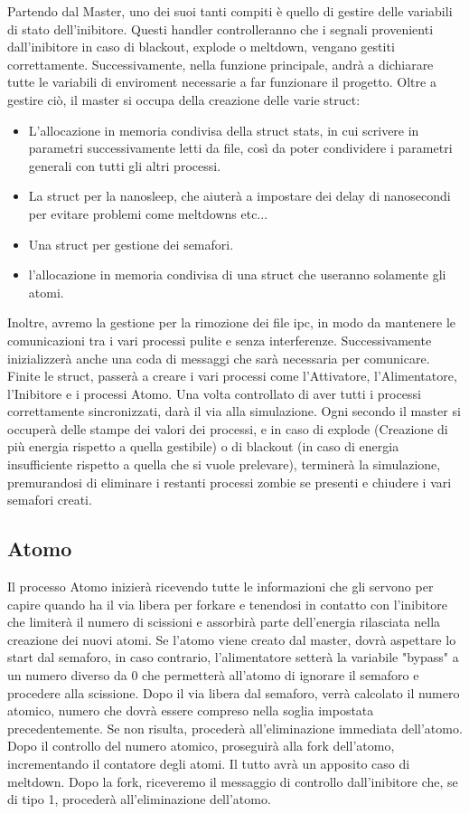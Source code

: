 \documentclass{article}
\begin{document}
Partendo dal Master, uno dei suoi tanti compiti è quello di gestire delle variabili di stato dell'inibitore. Questi handler controlleranno che i segnali provenienti dall'inibitore in caso di blackout, explode o meltdown, vengano gestiti correttamente.
Successivamente, nella funzione principale, andrà a dichiarare tutte le variabili di enviroment necessarie a far funzionare il progetto.
Oltre a gestire ciò, il master si occupa della creazione delle varie struct:
\begin{itemize}
\item L'allocazione in memoria condivisa della struct stats, in cui scrivere in parametri 
 successivamente letti da file, così da poter condividere i parametri generali con tutti gli altri processi.
\item La struct per la nanosleep, che aiuterà a impostare dei delay di nanosecondi per evitare problemi come meltdowns etc...
\item Una struct per gestione dei semafori.
\item l'allocazione in memoria condivisa di una struct che useranno solamente gli atomi.
\end{itemize}
Inoltre, avremo la gestione per la rimozione dei file ipc, in modo da mantenere le comunicazioni tra i vari processi pulite e senza interferenze.
Successivamente inizializzerà anche una coda di messaggi che sarà necessaria per comunicare.
Finite le struct, passerà a creare i vari processi come l'Attivatore, l'Alimentatore, l'Inibitore e i processi Atomo. Una volta controllato di aver tutti i processi correttamente sincronizzati, darà il via alla simulazione. Ogni secondo il master si occuperà delle stampe dei valori dei processi, e in caso di explode (Creazione di più energia rispetto a quella gestibile) o di blackout (in caso di energia insufficiente rispetto a quella che si vuole prelevare), terminerà la simulazione, premurandosi di eliminare i restanti processi zombie se presenti e chiudere i vari semafori creati.

\subsection{Atomo}
Il processo Atomo inizierà ricevendo tutte le informazioni che gli servono per capire quando ha il via libera per forkare e tenendosi in contatto con l'inibitore che limiterà il numero di scissioni e assorbirà parte dell'energia rilasciata nella creazione dei nuovi atomi.
Se l'atomo viene creato dal master, dovrà aspettare lo start dal semaforo, in caso contrario, l'alimentatore setterà la variabile "bypass" a un numero diverso da 0 che permetterà all'atomo di ignorare il semaforo e procedere alla scissione. Dopo il via libera dal semaforo, verrà calcolato il numero atomico, numero che dovrà essere compreso nella soglia impostata precedentemente. Se non risulta, procederà all'eliminazione immediata dell'atomo.
Dopo il controllo del numero atomico, proseguirà alla fork dell'atomo, incrementando il contatore degli atomi. Il tutto avrà un apposito caso di meltdown.
Dopo la fork, riceveremo il messaggio di controllo dall'inibitore che, se di tipo 1, procederà all'eliminazione dell'atomo.
\end{document}
